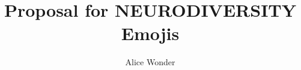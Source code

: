 \documentclass[letterpaper, 11pt]{scrartcl}
\title{Proposal for NEURODIVERSITY Emojis}
\author{Alice Wonder}
\begin{document}
\maketitle




\pagebreak
\tableofcontents
\pagebreak
\listoffigures

\pagebreak








\pagebreak
\appendix

\clearpage
\pagebreak

\pagebreak

\end{document}
